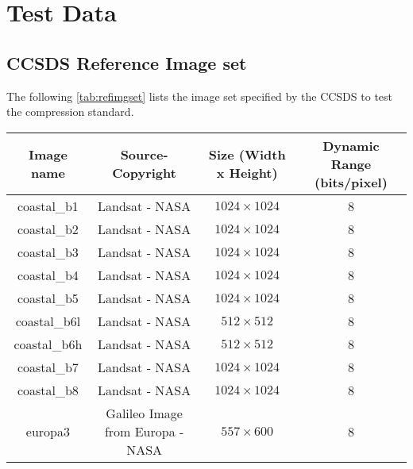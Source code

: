 \chapter{Test Data}\label{testdat}

\section{CCSDS Reference Image set}

The following \autoref{tab:refimgset} lists the image set specified by the \gls{CCSDS} to test the compression standard.
\begin{table}[h]
\begin{adjustbox}{max width=\textwidth}
\begin{tabular}{@{}cccc@{}}
\toprule
Image name                & Source- Copyright                 & Size (Width x Height) & Dynamic Range (bits/pixel) \\ \midrule
coastal\_b1               & Landsat - NASA                    & $1024\times 1024$           & 8                          \\
coastal\_b2               & Landsat - NASA                    & $1024\times 1024$           & 8                          \\
coastal\_b3               & Landsat - NASA                    & $1024\times 1024$           & 8                          \\
coastal\_b4               & Landsat - NASA                    & $1024\times 1024$           & 8                          \\
coastal\_b5               & Landsat - NASA                    & $1024\times 1024$           & 8                          \\
coastal\_b6l              & Landsat - NASA                    & $512\times 512$             & 8                          \\
coastal\_b6h              & Landsat - NASA                    & $512\times 512$             & 8                          \\
coastal\_b7               & Landsat - NASA                    & $1024\times 1024$           & 8                          \\
coastal\_b8               & Landsat - NASA                    & $1024\times 1024$           & 8                          \\
europa3                   & Galileo Image from Europa - NASA  & $557\times 600$             & 8                          \\

\end{tabular}
\end{adjustbox}
\end{table}
